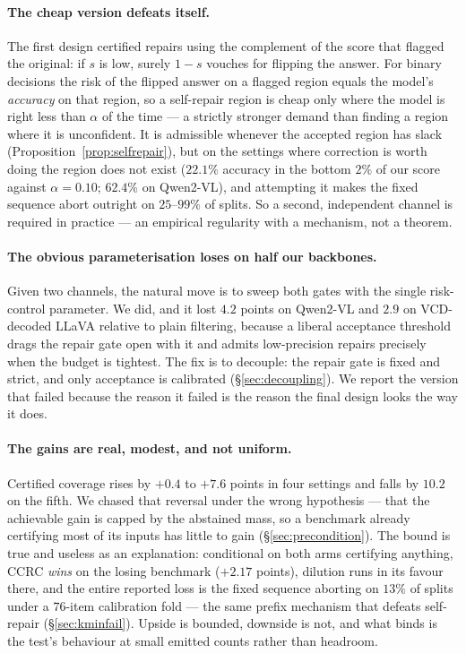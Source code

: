 \documentclass[review,number,doubleblind]{elsarticle}
\theoremstyle{plain}
\theoremstyle{definition}
\theoremstyle{remark}
\begin{document}
\paragraph{The cheap version defeats itself.}
The first design certified repairs using the complement of the score that flagged the
original: if $s$ is low, surely $1-s$ vouches for flipping the answer. For binary decisions
the risk of the flipped answer on a flagged region equals the model's \emph{accuracy} on that
region, so a self-repair region is cheap only where the model is right less than $\alpha$ of
the time --- a strictly stronger demand than finding a region where it is unconfident. It is
admissible whenever the accepted region has slack (Proposition~\ref{prop:selfrepair}), but on
the settings where correction is worth doing the region does not exist ($22.1\%$ accuracy in
the bottom $2\%$ of our score against $\alpha=0.10$; $62.4\%$ on Qwen2-VL), and attempting it
makes the fixed sequence abort outright on $25$--$99\%$ of splits. So a second, independent
channel is required in practice --- an empirical regularity with a mechanism, not a theorem.

\paragraph{The obvious parameterisation loses on half our backbones.}
Given two channels, the natural move is to sweep both gates with the single risk-control
parameter. We did, and it lost $4.2$ points on Qwen2-VL and $2.9$ on VCD-decoded LLaVA
relative to plain filtering, because a liberal acceptance threshold drags the repair gate
open with it and admits low-precision repairs precisely when the budget is tightest. The
fix is to decouple: the repair gate is fixed and strict, and only acceptance is calibrated
(\S\ref{sec:decoupling}). We report the version that failed because the reason it failed is
the reason the final design looks the way it does.

\paragraph{The gains are real, modest, and not uniform.}
Certified coverage rises by $+0.4$ to $+7.6$ points in four settings and falls by $10.2$ on
the fifth. We chased that reversal under the wrong hypothesis --- that the achievable gain is
capped by the abstained mass, so a benchmark already certifying most of its inputs has little
to gain (\S\ref{sec:precondition}). The bound is true and useless as an explanation:
conditional on both arms certifying anything, CCRC \emph{wins} on the losing benchmark
($+2.17$ points), dilution runs in its favour there, and the entire reported loss is the fixed
sequence aborting on $13\%$ of splits under a $76$-item calibration fold --- the same prefix
mechanism that defeats self-repair (\S\ref{sec:kminfail}). Upside is bounded, downside is not,
and what binds is the test's behaviour at small emitted counts rather than headroom.
\end{document}
